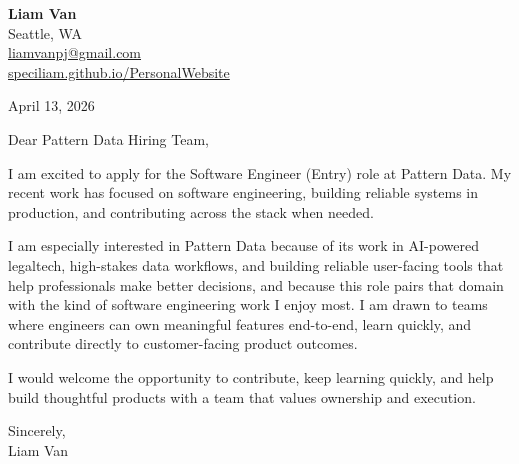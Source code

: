 \documentclass[letterpaper,11pt]{article}
\begin{document}
\begin{flushleft}
\textbf{\Large Liam Van} \\
Seattle, WA \\
\href{mailto:liamvanpj@gmail.com}{liamvanpj@gmail.com} \\
\href{https://speciliam.github.io/PersonalWebsite}{speciliam.github.io/PersonalWebsite}
\end{flushleft}

April 13, 2026

\noindent Dear Pattern Data Hiring Team,

\noindent I am excited to apply for the Software Engineer (Entry) role at Pattern Data. My recent work has focused on software engineering, building reliable systems in production, and contributing across the stack when needed.

\noindent I am especially interested in Pattern Data because of its work in AI-powered legaltech, high-stakes data workflows, and building reliable user-facing tools that help professionals make better decisions, and because this role pairs that domain with the kind of software engineering work I enjoy most. I am drawn to teams where engineers can own meaningful features end-to-end, learn quickly, and contribute directly to customer-facing product outcomes.

\noindent I would welcome the opportunity to contribute, keep learning quickly, and help build thoughtful products with a team that values ownership and execution.

\noindent Sincerely, \\
Liam Van
\end{document}
